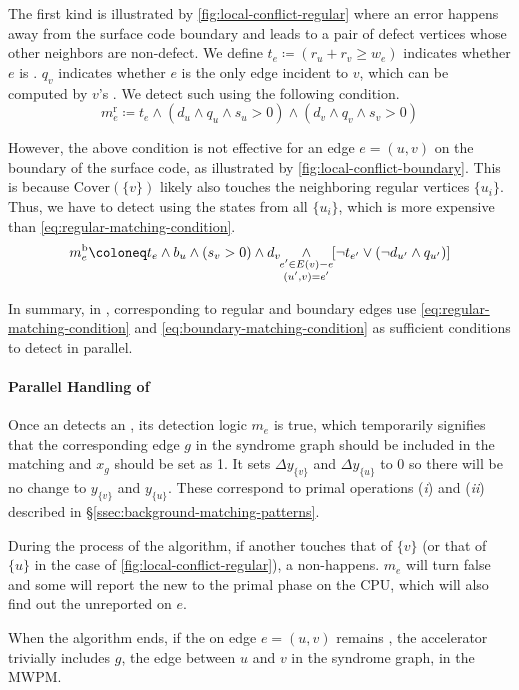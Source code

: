 The first kind is illustrated by \autoref{fig:local-conflict-regular} where an \isl error happens away from the surface code boundary and leads to a pair of defect vertices whose other neighbors are non-defect.
We define $t_e \coloneq (r_u + r_v \ge w_e)$ indicates whether $e$ is \tight.
$q_v$ indicates whether $e$ is the only \tight edge incident to $v$, which can be computed by $v$'s \puv.
We detect such \isl \confs using the following condition.
\begin{equation}
m^\text{r}_e \coloneq t_e \land (d_u \land q_u \land s_u > 0) \land (d_v \land q_v \land s_v > 0) \label{eq:regular-matching-condition}
\end{equation}

However, the above condition is not effective for an edge $e= (u,v)$ on the boundary of the surface code, as illustrated by \autoref{fig:local-conflict-boundary}.
This is because $\text{Cover}(\{v\})$ likely also touches the neighboring regular vertices $\{u_i\}$.
Thus, we have to detect \isl \confs using the \puv states from all $\{u_i\}$, which is more expensive than \autoref{eq:regular-matching-condition}.
\begin{equation}
m^\text{b}_e \coloneq t_e \land b_u \land (s_v > 0) \land d_v \dns\underset{\substack{e' \in E(v) - e\\ (u', v) = e'}}{\land}\dns\left[\neg t_{e'} \lor (\neg d_{u'} \land q_{u'})\right] \label{eq:boundary-matching-condition}
\end{equation}

In summary, in \arch, \pues corresponding to regular and boundary edges use \autoref{eq:regular-matching-condition} and \autoref{eq:boundary-matching-condition} as sufficient conditions to detect \isl \confs in parallel.

\paragraph{Parallel Handling of \Isl \conf}
Once an \pue detects an \isl \conf, its detection logic $m_e$ is true, which temporarily signifies that the corresponding edge $g$ in the syndrome graph should be included in the matching and $x_g$  should be set as 1. It sets  $\Delta y_{\{v\}}$ and $\Delta y_{\{u\}}$ to $0$ so there will be no change to  $y_{\{v\}}$ and $y_{\{u\}}$. These correspond to primal operations (\textit{i}) and (\textit{ii}) described in \S\ref{ssec:background-matching-patterns}.

During the process of the algorithm, if another \cov touches that of $\{v\}$ (or that of $\{u\}$ in the case of \autoref{fig:local-conflict-regular}), a non-\isl \conf happens. $m_e$ will turn false and some \pue will report the new \conf to the primal phase on the CPU, which will also find out the unreported \conf on $e$.

When the algorithm ends, if the \conf on edge $e=(u,v)$ remains \isl, the accelerator trivially includes $g$, the edge between $u$ and $v$ in the syndrome graph, in the MWPM.
